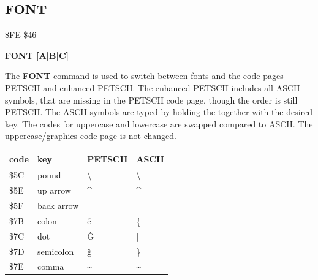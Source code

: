\subsection{FONT}
\begin{description}[leftmargin=2cm,style=nextline]
\item [Token:] \$FE \$46
\item [Format:] {\bf FONT [A|B|C]}
\item [Usage:] The {\bf FONT} command is used to switch between fonts
               and the code pages PETSCII and enhanced PETSCII.
               The enhanced PETSCII includes all ASCII symbols, that
               are missing in the PETSCII code page, though the order
               is still PETSCII.
               The ASCII symbols are typed by holding the \megasymbolkey
               together with the desired key.
               The codes for uppercase and lowercase
               are swapped compared to ASCII.
               The uppercase/graphics code page is not changed.

\ttfamily
{\setlength{\tabcolsep}{1mm}
\begin{tabular}{*{4}{|R{2.0cm}}|}
\hline
 code  &   key & PETSCII & ASCII  \\
\hline
\$5C & pound      & {\codefont \textbackslash}   & \textbackslash  \\
\$5E & up arrow   & {\codefont \textasciicircum} & \textasciicircum  \\
\$5F & back arrow & {\codefont \_}               & \_   \\
\$7B & colon      & {\codefont ě }               & \{   \\
\$7C & dot        & {\codefont Ĝ }               &  |   \\
\$7D & semicolon  & {\codefont ĝ }               & \}   \\
\$7E & comma      & {\codefont \textasciitilde}  & \textasciitilde   \\
\hline
\end{tabular}
}

%
%
%



\end{description}
